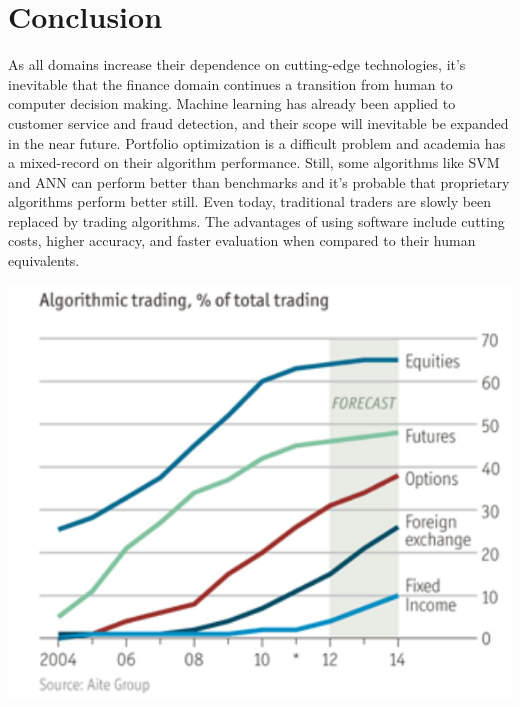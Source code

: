 \documentclass[12pt]{report}
\begin{document}
\newpage\thispagestyle{fancy}\sectionfont{\scshape}
\section*{ Conclusion}
\par\noindent
As all domains increase their dependence on cutting-edge technologies, it's inevitable that the finance domain continues a transition from human to computer decision making. Machine learning has already been applied to customer service and fraud detection, and their scope will inevitable be expanded in the near future. Portfolio optimization is a difficult problem and academia has a mixed-record on their algorithm performance. Still, some algorithms like SVM and ANN can perform better than benchmarks and it's probable that proprietary algorithms perform better still. Even today, traditional traders are slowly been replaced by trading algorithms. The advantages of using software include cutting costs, higher accuracy, and faster evaluation when compared to their human equivalents. \\

\begin{center}
\includegraphics[scale=0.4]{autotrade}
\end{center} 

 \noindent

\newpage
\end{document}
